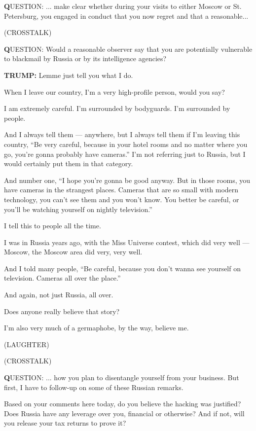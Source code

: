 \textbf{Q}UESTION: ... make clear whether during your visits to either
Moscow or St. Petersburg, you engaged in conduct that you now regret and
that a reasonable...

(CROSSTALK)

\textbf{Q}UESTION: Would a reasonable observer say that you are
potentially vulnerable to blackmail by Russia or by its intelligence
agencies?

\textbf{TRUMP:} Lemme just tell you what I do.

When I leave our country, I'm a very high-profile person, would you say?

I am extremely careful. I'm surrounded by bodyguards. I'm surrounded by
people.

And I always tell them --- anywhere, but I always tell them if I'm
leaving this country, ``Be very careful, because in your hotel rooms and
no matter where you go, you're gonna probably have cameras.'' I'm not
referring just to Russia, but I would certainly put them in that
category.

And number one, ``I hope you're gonna be good anyway. But in those
rooms, you have cameras in the strangest places. Cameras that are so
small with modern technology, you can't see them and you won't know. You
better be careful, or you'll be watching yourself on nightly
television.''

I tell this to people all the time.

I was in Russia years ago, with the Miss Universe contest, which did
very well --- Moscow, the Moscow area did very, very well.

And I told many people, ``Be careful, because you don't wanna see
yourself on television. Cameras all over the place.''

And again, not just Russia, all over.

Does anyone really believe that story?

I'm also very much of a germaphobe, by the way, believe me.

(LAUGHTER)

(CROSSTALK)

\textbf{Q}UESTION: ... how you plan to disentangle yourself from your
business. But first, I have to follow-up on some of these Russian
remarks.

Based on your comments here today, do you believe the hacking was
justified? Does Russia have any leverage over you, financial or
otherwise? And if not, will you release your tax returns to prove it?

